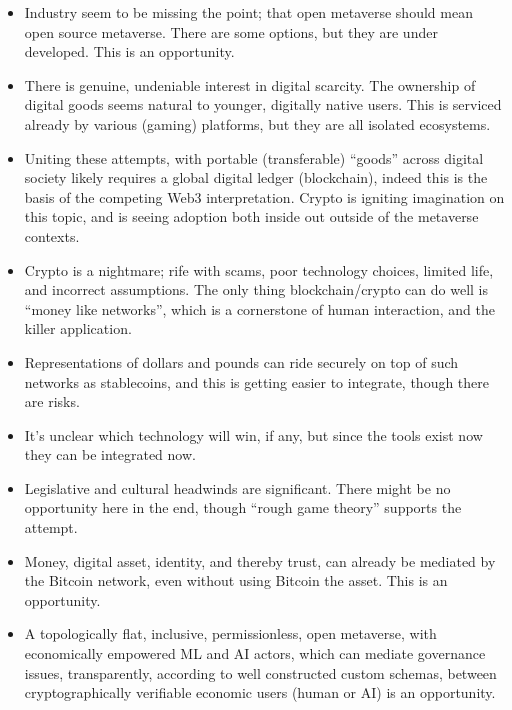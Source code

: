 \begin{itemize}
\item Industry seem to be missing the point; that open metaverse should mean open source metaverse. There are some options, but they are under developed. This is an opportunity.
\item There is genuine, undeniable interest in digital scarcity. The ownership of digital goods seems natural to younger, digitally native users. This is serviced already by various (gaming) platforms, but they are all isolated ecosystems.
\item Uniting these attempts, with portable (transferable) ``goods'' across digital society likely requires a global digital ledger (blockchain), indeed this is the basis of the competing Web3 interpretation. Crypto is igniting imagination on this topic, and is seeing adoption both inside out outside of the metaverse contexts.
\item Crypto is a nightmare; rife with scams, poor technology choices, limited life, and incorrect assumptions. The only thing blockchain/crypto can do well is ``money like networks'', which is a cornerstone of human interaction, and the killer application.
\item Representations of dollars and pounds can ride securely on top of such networks as stablecoins, and this is getting easier to integrate, though there are risks.
\item It's unclear which technology will win, if any, but since the tools exist now they can be integrated now.
\item Legislative and cultural headwinds are significant. There might be no opportunity here in the end, though ``rough game theory'' supports the attempt.
\item Money, digital asset, identity, and thereby trust, can already be mediated by the Bitcoin network, even without using Bitcoin the asset. This is an opportunity.
\item A topologically flat, inclusive, permissionless, open metaverse, with economically empowered ML and AI actors, which can mediate governance issues, transparently, according to well constructed custom schemas, between cryptographically verifiable economic users (human or AI) is an opportunity.

\end{itemize}

